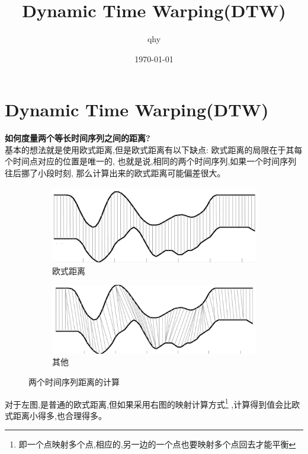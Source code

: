 \documentclass[UTF8,a4paper]{ctexart}
\author{ qhy }
\date{\today}
\title{Dynamic Time Warping(DTW)}
\begin{document}
  \maketitle
  \tableofcontents
  \newpage

  \section{Dynamic Time Warping(DTW)}
  \textbf{如何度量两个等长时间序列之间的距离?}\\
  基本的想法就是使用欧式距离,但是欧式距离有以下缺点:
  欧式距离的局限在于其每个时间点对应的位置是唯一的,
  也就是说,相同的两个时间序列,如果一个时间序列往后挪了小段时刻,
  那么计算出来的欧式距离可能偏差很大。
  \begin{figure}[H]
    \centering
    \begin{subfigure}[H]{0.4\textwidth}
        \includegraphics[width=\textwidth]{assets/DynamicTimeWarping(DTW)_bb83b.png}
        \caption{欧式距离}
    \end{subfigure}
    \begin{subfigure}[H]{0.4\textwidth}
        \includegraphics[width=\textwidth]{assets/DynamicTimeWarping(DTW)_5eacd.png}
        \caption{其他}
    \end{subfigure}
    \caption{两个时间序列距离的计算}
  \end{figure}

  对于左图,是普通的欧式距离,但如果采用右图的映射计算方式\footnote{即一个点映射多个点,相应的,另一边的一个点也要映射多个点回去才能平衡}
  ,计算得到值会比欧式距离小得多,也合理得多。
\end{document}
